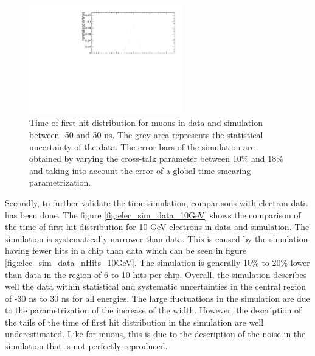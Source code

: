 \documentclass{JINST}
\begin{document}
\begin{figure}[htbp!]
	\centering
	\includegraphics[width=0.6\textwidth]{fig/Comparison_MokkaDD4hepData_Muons.pdf}
	\caption{Time of first hit distribution for muons in data and simulation between -50 and 50 ns. The grey area represents the statistical uncertainty of the data. The error bars of the simulation are obtained by varying the cross-talk parameter between 10\% and 18\% and taking into account the error of a global time smearing parametrization.}
	\label{fig:sim_data_muon}
\end{figure}

Secondly, to further validate the time simulation, comparisons with electron data has been done. The figure \ref{fig:elec_sim_data_10GeV} shows the comparison of the time of first hit distribution for 10 GeV electrons in data and simulation. The simulation is systematically narrower than data. This is caused by the simulation having fewer hits in a chip than data which can be seen in figure \ref{fig:elec_sim_data_nHits_10GeV}. The simulation is generally 10\% to 20\% lower than data in the region of 6 to 10 hits per chip. Overall, the simulation describes well the data within statistical and systematic uncertainties in the central region of -30 ns to 30 ns for all energies. The large fluctuations in the simulation are due to the parametrization of the increase of the width. However, the description of the tails of the time of first hit distribution in the simulation are well underestimated. Like for muons, this is due to the description of the noise in the simulation that is not perfectly reproduced.
\end{document}
